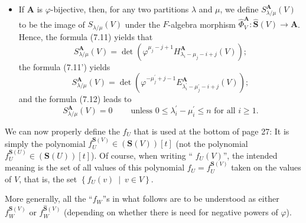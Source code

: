 \documentclass[numbers=enddot,12pt,final,onecolumn,notitlepage]{scrartcl}%
\theoremstyle{definition}
\begin{document}
\begin{enumerate}
\begin{itemize}
\item If $\mathbf{A}$ is $\varphi$-bijective, then, for any two partitions
$\lambda$ and $\mu$, we define $S_{\lambda/\mu}^{\mathbf{A}}\left(  V\right)
$ to be the image of $S_{\lambda/\mu}\left(  V\right)  $ under the $F$-algebra
morphism $\widehat{\Phi}_{V}^{\mathbf{A}}:\widehat{\mathbf{S}}\left(
V\right)  \rightarrow\mathbf{A}$. Hence, the formula (7.11) yields that%
\begin{equation}
S_{\lambda/\mu}^{\mathbf{A}}\left(  V\right)  =\det\left(  \varphi^{\mu
_{j}-j+1}H_{\lambda_{i}-\mu_{j}-i+j}^{\mathbf{A}}\left(  V\right)  \right)  ;
\label{p26.7.11}%
\end{equation}
the formula (7.11') yields%
\begin{equation}
S_{\lambda/\mu}^{\mathbf{A}}\left(  V\right)  =\det\left(  \varphi^{-\mu
_{j}^{\prime}+j-1}E_{\lambda_{i}^{\prime}-\mu_{j}^{\prime}-i+j}^{\mathbf{A}%
}\left(  V\right)  \right)  ; \label{p26.7.11'}%
\end{equation}
and the formula (7.12) leads to%
\begin{equation}
S_{\lambda/\mu}^{\mathbf{A}}\left(  V\right)
=0\ \ \ \ \ \ \ \ \ \ \text{unless }0\leq\lambda_{i}^{\prime}-\mu_{i}^{\prime
}\leq n\text{ for all }i\geq1. \label{p26.7.12}%
\end{equation}

\end{itemize}

We can now properly define the $f_{U}$ that is used at the bottom of page 27:
It is simply the polynomial $f_{U}^{\mathbf{S}\left(  V\right)  }\in\left(
\mathbf{S}\left(  V\right)  \right)  \left[  t\right]  $ (not the polynomial
$f_{U}^{\mathbf{S}\left(  U\right)  }\in\left(  \mathbf{S}\left(  U\right)
\right)  \left[  t\right]  $). Of course, when writing \textquotedblleft%
$f_{U}\left(  V\right)  $\textquotedblright, the intended meaning is the set
of all values of this polynomial $f_{U}=f_{U}^{\mathbf{S}\left(  V\right)  }$
taken on the values of $V$, that is, the set $\left\{  f_{U}\left(  v\right)
\ \mid\ v\in V\right\}  $.

More generally, all the \textquotedblleft$f_{W}$\textquotedblright s in what
follows are to be understood as either $f_{W}^{\mathbf{S}\left(  V\right)  }$
or $f_{W}^{\widehat{\mathbf{S}}\left(  V\right)  }$ (depending on whether
there is need for negative powers of $\varphi$).


\end{enumerate}
\end{document}
